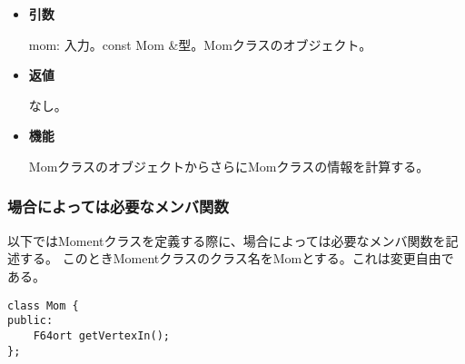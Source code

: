 \begin{itemize}

\item {\bf 引数}

  mom: 入力。const Mom \&型。Momクラスのオブジェクト。
  
\item {\bf 返値}

  なし。

\item {\bf 機能}

  MomクラスのオブジェクトからさらにMomクラスの情報を計算する。
  
\end{itemize}

\subsubsection{場合によっては必要なメンバ関数}


以下ではMomentクラスを定義する際に、場合によっては必要なメンバ関数を記述する。
このときMomentクラスのクラス名をMomとする。これは変更自由である。


\begin{screen}
\begin{verbatim}
class Mom {
public:
    F64ort getVertexIn();
};
\end{verbatim}
\end{screen}

